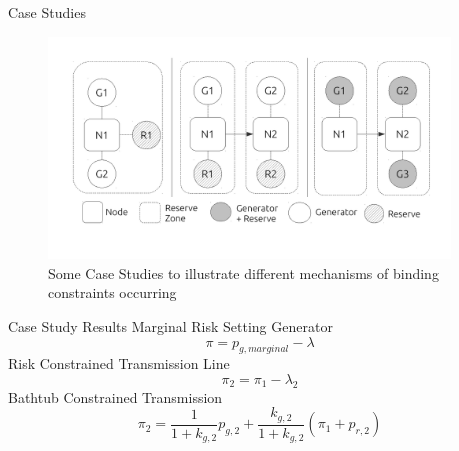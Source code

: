 \documentclass[xcolor=x11names,compress]{beamer}
\renewcommand{\(}{\begin{columns}}
\renewcommand{\)}{\end{columns}}
\newcommand{\<}[1]{\begin{column}{#1}}
\renewcommand{\>}{\end{column}}
\begin{document}
\begin{frame}{Case Studies}
\begin{figure}
\includegraphics[width=0.95\textwidth]{img/nodal_diagram.pdf}
\caption{Some Case Studies to illustrate different mechanisms of binding
constraints occurring}
\end{figure}
\end{frame}


\begin{frame}{Case Study Results}
Marginal Risk Setting Generator
\begin{equation}
\pi = p_{g,marginal} - \lambda
\end{equation}
Risk Constrained Transmission Line
\begin{equation}
\pi_2 = \pi_1 - \lambda_2
\end{equation}
Bathtub Constrained Transmission
\begin{equation}
\pi_2 = \dfrac{1}{1+k_{g,2}}p_{g,2} + \dfrac{k_{g,2}}{1+k_{g,2}}(\pi_1 + p_{r,2})
\end{equation}
\end{frame}
\end{document}
